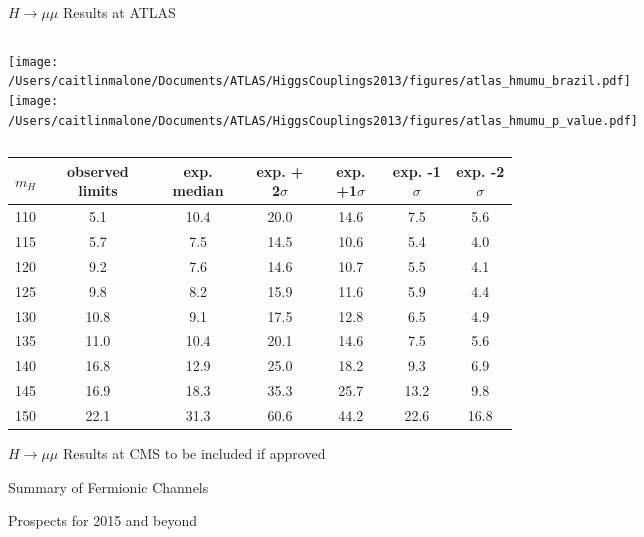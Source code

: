 \documentclass{beamer}
\begin{document}
\begin{frame}{$H\rightarrow\mu\mu$ Results at ATLAS}
	\begin{columns}
		\column{2.5in}
			\texttt{[image: /Users/caitlinmalone/Documents/ATLAS/HiggsCouplings2013/figures/atlas\_hmumu\_brazil.pdf]}
		\column{2.5in}
			\texttt{[image: /Users/caitlinmalone/Documents/ATLAS/HiggsCouplings2013/figures/atlas\_hmumu\_p\_value.pdf]}			
	\end{columns}
	
	\begin{table}
	\scriptsize
	\begin{tabular}{c | c | c | c | c | c | c } 
	\hline 
	$m_H$ & observed limits & exp. median & exp. + 2$\sigma$ & exp. +1$\sigma$ & exp. -1$\sigma$ & exp. -2$\sigma$ \\ \hline
	110 & 5.1 & 10.4 & 20.0 & 14.6 & 7.5 & 5.6 \\
	115 & 5.7 & 7.5 & 14.5 & 10.6 & 5.4 & 4.0 \\
	120 & 9.2 & 7.6 & 14.6 & 10.7 & 5.5 & 4.1 \\
	\textcolor{BrickRed}{125} & \textcolor{BrickRed}{9.8} &\textcolor{BrickRed}{8.2} & \textcolor{BrickRed}{15.9} & \textcolor{BrickRed}{11.6} & \textcolor{BrickRed}{5.9} & \textcolor{BrickRed}{4.4} \\
	130 & 10.8 & 9.1 & 17.5 & 12.8 & 6.5 & 4.9 \\
	135 & 11.0 & 10.4 & 20.1 & 14.6 & 7.5 & 5.6 \\
	140 & 16.8 & 12.9 & 25.0 & 18.2 & 9.3 & 6.9 \\
	145 & 16.9 & 18.3 & 35.3 & 25.7 & 13.2 & 9.8 \\
	150 & 22.1 & 31.3 & 60.6 & 44.2 & 22.6 & 16.8 \\ \hline
	\end{tabular}
	\end{table}
\end{frame}


\begin{frame}{$H\rightarrow\mu\mu$ Results at CMS}
to be included if approved
\end{frame}


\begin{frame}{Summary of Fermionic Channels}

\end{frame}


\begin{frame}{Prospects for 2015 and beyond}

\end{frame}
\end{document}
